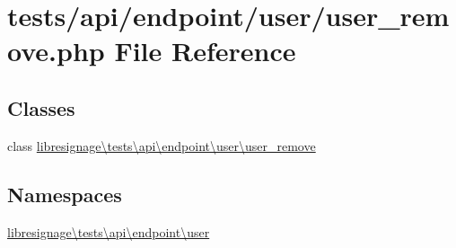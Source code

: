 \hypertarget{tests_2api_2endpoint_2user_2user__remove_8php}{}\section{tests/api/endpoint/user/user\+\_\+remove.php File Reference}
\label{tests_2api_2endpoint_2user_2user__remove_8php}
\subsection*{Classes}
\begin{DoxyCompactItemize}
\item 
class \hyperlink{classlibresignage_1_1tests_1_1api_1_1endpoint_1_1user_1_1user__remove}{libresignage\textbackslash{}tests\textbackslash{}api\textbackslash{}endpoint\textbackslash{}user\textbackslash{}user\+\_\+remove}
\end{DoxyCompactItemize}
\subsection*{Namespaces}
\begin{DoxyCompactItemize}
\item 
 \hyperlink{namespacelibresignage_1_1tests_1_1api_1_1endpoint_1_1user}{libresignage\textbackslash{}tests\textbackslash{}api\textbackslash{}endpoint\textbackslash{}user}
\end{DoxyCompactItemize}
